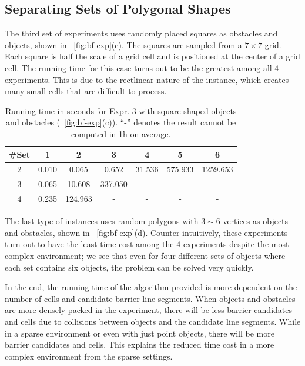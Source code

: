 \subsection{Separating Sets of Polygonal Shapes}
The third set of experiments uses randomly placed squares as obstacles and objects, shown in ~\ref{fig:bf-exp}(c). The squares are sampled from a $7\times7$ grid. Each square is half the scale of a grid cell and is positioned at the center of a grid cell. The running time for this case turns out to be the greatest among all $4$ experiments. This is due to the rectlinear nature of the instance, which creates many small cells that are difficult to process. 

\begin{table}[ht]
    \centering
    \begin{tabular}{|c|c|c|c|c|c|c|}\hline
         \#Set &  1 & 2 & 3 & 4& 5& 6\\\hline
 2 & 0.010 & 0.065 & 0.652 & 31.536 & 575.933 & 1259.653\\\hline
 3 & 0.065 & 10.608 & 337.050 & - & - & -\\\hline
 4 & 0.235 & 124.963 & - & - & - & -\\\hline
    \end{tabular}
    \caption[Running time in seconds for Expr. 3]{Running time in seconds for Expr. 3 with square-shaped objects and obstacles (~\ref{fig:bf-exp}(c)). ``-'' denotes the result cannot be computed in 1h on average. 
    }
    \label{tab:bf-expr_3}
    \vspace{-2mm}
\end{table}
 
The last type of instances uses random polygons with $3\sim 6$ vertices
as objects and obstacles, shown in ~\ref{fig:bf-exp}(d). 
Counter intuitively, these experiments turn out to have the least time cost among the $4$ experiments despite the most complex environment; we see that even for four different sets of objects where each set contains six objects, the problem can be solved very quickly. %

In the end, the running time of the algorithm provided is more dependent on the number of cells and candidate barrier line segments. 
When objects and obstacles are more densely packed in the experiment, 
there will be less barrier candidates and cells due to collisions between objects and the candidate line segments.
While in a sparse environment or even with just point objects, there will be more barrier candidates and cells.
This explains the reduced time cost in a more complex environment from the sparse settings.

